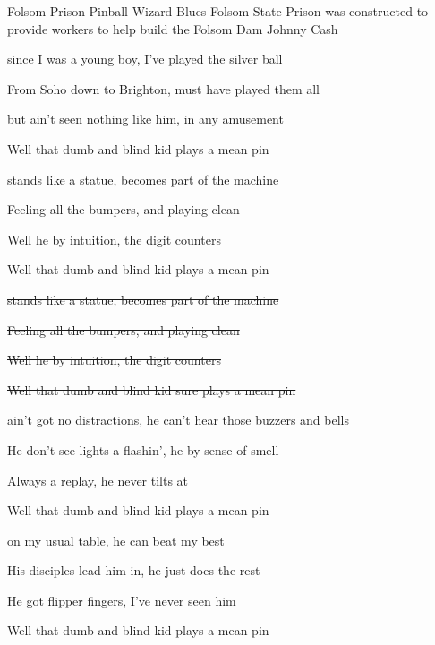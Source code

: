 \begin{SBSong}{Folsom Prison Pinball Wizard Blues}
  {Folsom State Prison was constructed to provide workers to help build the Folsom Dam}
  {Johnny Cash}
  \begin{SBVerse}
     since I was a young boy, I've played the silver ball
    
    From Soho down to Brighton,  must have played them all
    
    but  ain't seen nothing like him, in any amusement 
    
    Well that  dumb and blind kid  plays a mean pin
  \end{SBVerse}
  
  \begin{SBVerse}
     stands like a statue, becomes part of the machine
    
    Feeling all the bumpers, and  playing clean
    
    Well he  by intuition, the digit counters 
    
    Well that  dumb and blind kid  plays a mean pin
  \end{SBVerse}
  \begin{SBVerse}
    
    \sout{ stands like a statue, becomes part of the machine}
    
    \sout{Feeling all the bumpers, and  playing clean}
    
    \sout{Well he  by intuition, the digit counters }
    
    \sout{Well that  dumb and blind kid sure plays a mean pin}
  \end{SBVerse}
  \begin{SBVerse}
     ain't got no distractions, he can't hear those buzzers and bells
    
    He don't see lights a flashin', he  by sense of smell
    
    Always  a replay, he never tilts at 
    
    Well that  dumb and blind kid  plays a mean pin
  \end{SBVerse}
  \begin{SBVerse}
     on my usual table, he can beat my best 
    
    His disciples lead him in,  he just does the rest 
    
    He got  flipper fingers, I've never seen him  
    
    Well that  dumb and blind kid  plays a mean pin
  \end{SBVerse}
\end{SBSong}
